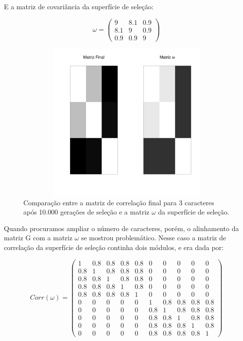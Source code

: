 E a matriz de covariância da superfície de seleção: 

\begin{equation}
    \omega = \left( \begin{smallmatrix} 9 & 8.1 & 0.9\\  8.1 & 9 & 0.9 \\ 0.9 & 0.9 & 9 \end{smallmatrix}  \right)
\end{equation}


\begin{figure}[htbp]
    \centering
    \includegraphics[width=150mm, height=80mm]{figuras/Mat3tracos}
    \caption{Comparação entre a matriz de correlação final para 3
        caracteres após 10.000
    gerações de seleção e a matriz $\omega$ da superfície de seleção.}
    \label{MatJones3tracos}
\end{figure}


Quando procuramos ampliar o número de caracteres, porém, o alinhamento da
matriz G com a matriz $\omega$ se mostrou problemático. 
Nesse caso a matriz de correlação da superfície de seleção continha dois
módulos, e era dada por:

\begin{equation}
    Corr(\omega) = \left( 
    \begin{smallmatrix} 
        1 & 0.8 & 0.8 & 0.8 & 0.8 & 0 & 0 & 0 & 0 & 0\\  
      0.8 & 1 & 0.8 & 0.8 & 0.8 & 0 & 0 & 0 & 0 & 0\\  
      0.8 & 0.8 & 1 & 0.8 & 0.8 & 0 & 0 & 0 & 0 & 0\\  
      0.8 & 0.8 & 0.8 & 1 & 0.8 & 0 & 0 & 0 & 0 & 0\\  
      0.8 & 0.8 & 0.8 & 0.8 & 1 & 0 & 0 & 0 & 0 & 0\\  
        0 & 0 & 0 & 0 & 0 & 1 & 0.8 & 0.8 & 0.8 & 0.8\\ 
        0 & 0 & 0 & 0 & 0 & 0.8 & 1 & 0.8 & 0.8 & 0.8\\
        0 & 0 & 0 & 0 & 0 & 0.8 & 0.8 & 1 & 0.8 & 0.8\\
        0 & 0 & 0 & 0 & 0 & 0.8 & 0.8 & 0.8 & 1 & 0.8\\
        0 & 0 & 0 & 0 & 0 & 0.8 & 0.8 & 0.8 & 0.8 & 1
    \end{smallmatrix}  \right)
    \label{matw}
\end{equation}

